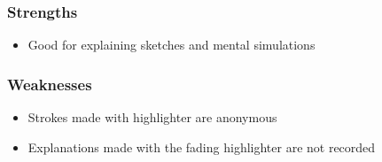 \subsubsection{Strengths}

\begin{itemize}
	\item Good for explaining sketches and mental simulations
\end{itemize}


\subsubsection{Weaknesses}	

\begin{itemize}
	\item Strokes made with highlighter are anonymous
	\item Explanations made with the fading highlighter are not recorded
\end{itemize}


	



